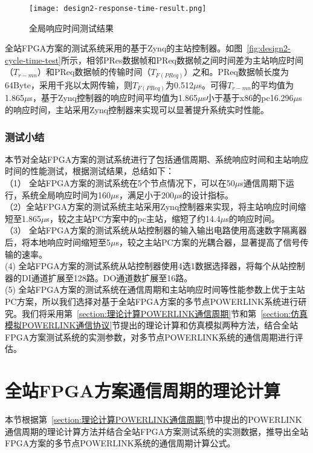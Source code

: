 \begin{figure}[!htb]
  \centering
  \texttt{[image: design2-response-time-result.png]}
  \caption{全局响应时间测试结果}
  \label{fig:design2-response-time-result}
\end{figure}

全站FPGA方案的测试系统采用的基于Zynq的主站控制器。如图~\ref{fig:design2-cycle-time-test}所示，相邻PRes数据帧和PReq数据帧之间时间差为主站响应时间（$T_{r-mn}$）和PReq数据帧的传输时间（$T_{F(PReq)}$）之和。PReq数据帧长度为64Byte，采用千兆以太网传输，则$T_{F(PReq)}$为0.512$\mu$s。可得$T_{r-mn}$的平均值为1.865$\mu$s，基于Zynq控制器的响应时间平均值为1.865$\mu$s小于基于x86的pc16.296$\mu$s的响应时间，主站采用Zynq控制器来实现可以显著提升系统实时性能。

\subsubsection{测试小结}
本节对全站FPGA方案的测试系统进行了包括通信周期、系统响应时间和主站响应时间的性能测试，根据测试结果，总结如下：\\
（1） 全站FPGA方案的测试系统在5个节点情况下，可以在50$\mu$s通信周期下运行，系统全局响应时间为160$\mu$s，满足小于200$\mu$s的设计指标。\\
（2）全站FPGA方案的测试系统主站采用Zynq控制器来实现，将主站响应时间缩短至1.865$\mu$s，较之主站PC方案中的pc主站，缩短了约14.4$\mu$s的响应时间。\\
（3） 全站FPGA方案的测试系统从站控制器的输入输出电路使用高速数字隔离器后，将本地响应时间缩短至5$\mu$s，较之主站PC方案的光耦合器，显著提高了信号传输的速率。\\
 (4) 全站FPGA方案的测试系统从站控制器使用4选1数据选择器，将每个从站控制器的DI通道扩展至128路。DO通道数扩展至16路。\\
 (5) 全站FPGA方案的测试系统在通信周期和主站响应时间等性能参数上优于主站PC方案，所以我们选择对基于全站FPGA方案的多节点POWERLINK系统进行研究。我们将采用第~\ref{section:理论计算POWERLINK通信周期}节和第~\ref{section:仿真模拟POWERLINK通信协议}节提出的理论计算和仿真模拟两种方法，结合全站FPGA方案测试系统的实测参数，对多节点POWERLINK系统的通信周期进行评估。


\section{全站FPGA方案通信周期的理论计算}
\label{section:全站FPGA方案通信周期的理论计算}

本节根据第~\ref{section:理论计算POWERLINK通信周期}节中提出的POWERLINK通信周期的理论计算方法并结合全站FPGA方案测试系统的实测数据，推导出全站FPGA方案的多节点POWERLINK系统的通信周期计算公式。

